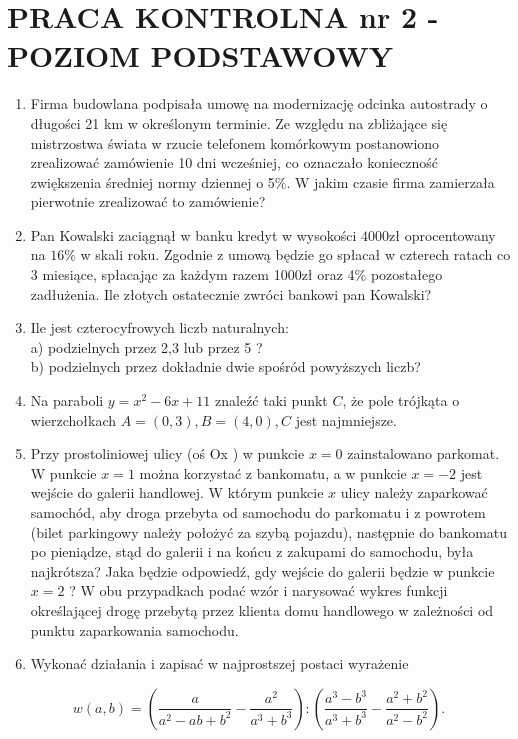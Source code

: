 \documentclass[10pt]{article}
\begin{document}
\section*{PRACA KONTROLNA nr 2 - POZIOM PODSTAWOWY}
\begin{enumerate}
  \item Firma budowlana podpisała umowę na modernizację odcinka autostrady o długości 21 km w określonym terminie. Ze względu na zbliżające się mistrzostwa świata w rzucie telefonem komórkowym postanowiono zrealizować zamówienie 10 dni wcześniej, co oznaczało konieczność zwiększenia średniej normy dziennej o 5\%. W jakim czasie firma zamierzała pierwotnie zrealizować to zamówienie?
  \item Pan Kowalski zaciągnął w banku kredyt w wysokości $4000 \mathrm{zł}$ oprocentowany na $16 \%$ w skali roku. Zgodnie z umową będzie go spłacał w czterech ratach co 3 miesiące, spłacając za każdym razem 1000zł oraz 4\% pozostałego zadłużenia. Ile złotych ostatecznie zwróci bankowi pan Kowalski?
  \item Ile jest czterocyfrowych liczb naturalnych:\\
a) podzielnych przez 2,3 lub przez 5 ?\\
b) podzielnych przez dokładnie dwie spośród powyższych liczb?
  \item Na paraboli $y=x^{2}-6 x+11$ znaleźć taki punkt $C$, że pole trójkąta o wierzchołkach $A=(0,3), B=(4,0), C$ jest najmniejsze.
  \item Przy prostoliniowej ulicy (oś Ox ) w punkcie $x=0$ zainstalowano parkomat. W punkcie $x=1$ można korzystać z bankomatu, a w punkcie $x=-2$ jest wejście do galerii handlowej. W którym punkcie $x$ ulicy należy zaparkować samochód, aby droga przebyta od samochodu do parkomatu i z powrotem (bilet parkingowy należy położyć za szybą pojazdu), następnie do bankomatu po pieniądze, stąd do galerii i na końcu z zakupami do samochodu, była najkrótsza? Jaka będzie odpowiedź, gdy wejście do galerii będzie w punkcie $x=2$ ? W obu przypadkach podać wzór i narysować wykres funkcji określającej drogę przebytą przez klienta domu handlowego w zależności od punktu zaparkowania samochodu.
  \item Wykonać działania i zapisać w najprostszej postaci wyrażenie
\end{enumerate}

$$
w(a, b)=\left(\frac{a}{a^{2}-a b+b^{2}}-\frac{a^{2}}{a^{3}+b^{3}}\right):\left(\frac{a^{3}-b^{3}}{a^{3}+b^{3}}-\frac{a^{2}+b^{2}}{a^{2}-b^{2}}\right) .
$$
\end{document}
